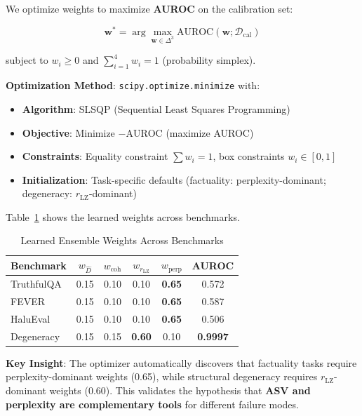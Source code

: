 \documentclass[10pt]{article}
\begin{document}
We optimize weights to maximize \textbf{AUROC} on the calibration set:

\begin{equation}
\mathbf{w}^* = \arg\max_{\mathbf{w} \in \Delta^3} \text{AUROC}(\mathbf{w}; \mathcal{D}_{\text{cal}})
\end{equation}

subject to $w_i \ge 0$ and $\sum_{i=1}^{4} w_i = 1$ (probability simplex).

\textbf{Optimization Method}: \texttt{scipy.optimize.minimize} with:
\begin{itemize}
\item \textbf{Algorithm}: SLSQP (Sequential Least Squares Programming)
\item \textbf{Objective}: Minimize $-\text{AUROC}$ (maximize AUROC)
\item \textbf{Constraints}: Equality constraint $\sum w_i = 1$, box constraints $w_i \in [0, 1]$
\item \textbf{Initialization}: Task-specific defaults (factuality: perplexity-dominant; degeneracy: $r_{\text{LZ}}$-dominant)
\end{itemize}

Table~\ref{tab:learned-weights} shows the learned weights across benchmarks.

\begin{table}[h]
\centering
\caption{Learned Ensemble Weights Across Benchmarks}
\label{tab:learned-weights}
\begin{tabular}{lccccc}
\toprule
\textbf{Benchmark} & $w_{\hat{D}}$ & $w_{\text{coh}}$ & $w_{r_{\text{LZ}}}$ & $w_{\text{perp}}$ & \textbf{AUROC} \\
\midrule
TruthfulQA  & 0.15 & 0.10 & 0.10 & \textbf{0.65} & 0.572 \\
FEVER       & 0.15 & 0.10 & 0.10 & \textbf{0.65} & 0.587 \\
HaluEval    & 0.15 & 0.10 & 0.10 & \textbf{0.65} & 0.506 \\
Degeneracy  & 0.15 & 0.15 & \textbf{0.60} & 0.10 & \textbf{0.9997} \\
\bottomrule
\end{tabular}
\end{table}

\textbf{Key Insight}: The optimizer automatically discovers that factuality tasks require perplexity-dominant weights (0.65), while structural degeneracy requires $r_{\text{LZ}}$-dominant weights (0.60). This validates the hypothesis that \textbf{ASV and perplexity are complementary tools} for different failure modes.
\end{document}
